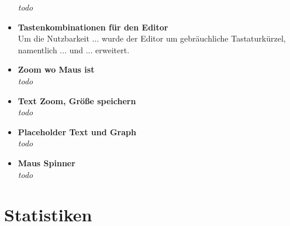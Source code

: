 \documentclass[parskip=full,11pt,twoside]{scrartcl}
\begin{document}
\begin{itemize}
        \textit{todo}
  \item \textbf{Tastenkombinationen für den Editor}\\
        Um die Nutzbarkeit ... wurde der Editor um gebräuchliche Tastaturkürzel, namentlich ... und ... erweitert.
  \item \textbf{Zoom wo Maus ist}\\
        \textit{todo}
  \item \textbf{Text Zoom, Größe speichern}\\
        \textit{todo}
  \item \textbf{Placeholder Text und Graph}\\
        \textit{todo}
  \item \textbf{Maus Spinner}\\
        \textit{todo}

\end{itemize}

\section{Statistiken}

\end{document}
